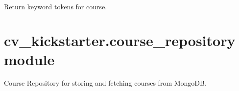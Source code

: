 \documentclass[letterpaper,10pt,english]{sphinxmanual}
\begin{document}

\begin{fulllineitems}
\label{cv_kickstarter:cv_kickstarter.course_keyword_tokenizer.course_keyword_tokens}
Return keyword tokens for course.

\end{fulllineitems}



\section{cv\_kickstarter.course\_repository module}
\label{cv_kickstarter:module-cv_kickstarter.course_repository}\label{cv_kickstarter:cv-kickstarter-course-repository-module}
Course Repository for storing and fetching courses from MongoDB.
\end{document}
